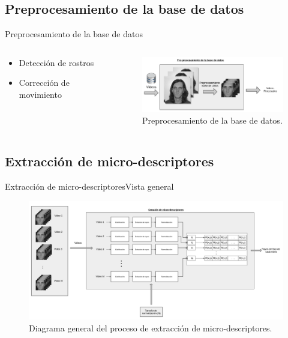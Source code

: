 \documentclass{beamer}
\begin{document}
	
    \subsection{Preprocesamiento de la base de datos}
        \begin{frame}{Preprocesamiento de la base de datos}
        
            \begin{columns}[onlytextwidth]
                \begin{column}{0.4\textwidth}
                    \begin{itemize}
                        \item Detección de rostros
                        \item Corrección de movimiento
                    \end{itemize}
                \end{column}
                \begin{column}{0.6\textwidth}
                    \begin{figure}[bt]
                		\centering
                        \includegraphics[width=7cm]{imagenes/Preprocesamiento.png}
                  		\caption{Preprocesamiento de la base de datos.}
                    \end{figure}
                \end{column}
            \end{columns}
        
        \end{frame}
    
    
    
    \subsection{Extracción de micro-descriptores}
        \begin{frame}{Extracción de micro-descriptores}{Vista general}
            \begin{figure}[bt]
        		\centering
                \includegraphics[width=12cm]{imagenes/Extractor_microdescriptores.png}
          		\caption{Diagrama general del proceso de extracción de micro-descriptores.}
            \end{figure}
        \end{frame}
    
\end{document}
